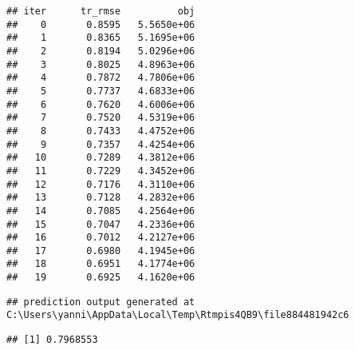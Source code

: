 \documentclass[
]{article}
\newenvironment{Shaded}{\begin{snugshade}}{\end{snugshade}}
\newcommand{\CommentTok}[1]{\textcolor[rgb]{0.56,0.35,0.01}{\textit{#1}}}
\newcommand{\DataTypeTok}[1]{\textcolor[rgb]{0.13,0.29,0.53}{#1}}
\newcommand{\DecValTok}[1]{\textcolor[rgb]{0.00,0.00,0.81}{#1}}
\newcommand{\KeywordTok}[1]{\textcolor[rgb]{0.13,0.29,0.53}{\textbf{#1}}}
\newcommand{\NormalTok}[1]{#1}
\newcommand{\OperatorTok}[1]{\textcolor[rgb]{0.81,0.36,0.00}{\textbf{#1}}}
\newcommand{\StringTok}[1]{\textcolor[rgb]{0.31,0.60,0.02}{#1}}
\begin{document}
\begin{verbatim}
## iter      tr_rmse          obj
##    0       0.8595   5.5650e+06
##    1       0.8365   5.1695e+06
##    2       0.8194   5.0296e+06
##    3       0.8025   4.8963e+06
##    4       0.7872   4.7806e+06
##    5       0.7737   4.6833e+06
##    6       0.7620   4.6006e+06
##    7       0.7520   4.5319e+06
##    8       0.7433   4.4752e+06
##    9       0.7357   4.4254e+06
##   10       0.7289   4.3812e+06
##   11       0.7229   4.3452e+06
##   12       0.7176   4.3110e+06
##   13       0.7128   4.2832e+06
##   14       0.7085   4.2564e+06
##   15       0.7047   4.2336e+06
##   16       0.7012   4.2127e+06
##   17       0.6980   4.1945e+06
##   18       0.6951   4.1774e+06
##   19       0.6925   4.1620e+06
\end{verbatim}

\begin{Shaded}
\end{Shaded}

\begin{verbatim}
## prediction output generated at C:\Users\yanni\AppData\Local\Temp\Rtmpis4QB9\file884481942c6
\end{verbatim}

\begin{Shaded}
\end{Shaded}

\begin{verbatim}
## [1] 0.7968553
\end{verbatim}

\begin{Shaded}
\end{Shaded}
\end{document}
